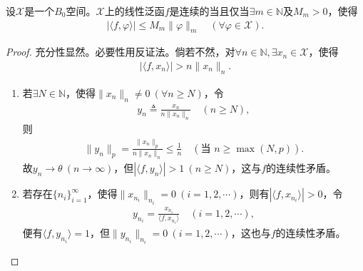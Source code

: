 \documentclass[../../main.tex]{subfiles}%
\begin{document}
\begin{lemma}\label{lemma:泛函分析--引理hweiowj}
设$\mathscr{X}$是一个$B_0$空间。$\mathscr{X}$上的线性泛函$f$是连续的当且仅当$\exists m\in\mathbb{N}$及$M_m>0$，使得
\begin{align*}
|\langle f,\varphi\rangle|\leqslant M_m\|\varphi\|_m\quad(\forall\varphi\in\mathscr{X}).
\end{align*}
\end{lemma}
\begin{proof}
充分性显然。必要性用反证法。倘若不然，对$\forall n\in\mathbb{N},\exists x_n\in\mathscr{X}$，使得
\begin{align}
|\langle f,x_n\rangle|>n\|x_n\|_n.\label{eq:4-2-5}
\end{align}
\begin{enumerate}[(1)]
\item 若$\exists N\in\mathbb{N}$，使得$\|x_n\|_n\neq0\ (\forall n\geqslant N)$，令
\begin{align*}
y_n\triangleq\frac{x_n}{n\|x_n\|_n}\quad(n\geqslant N),
\end{align*}
则
\begin{align*}
\|y_n\|_p=\frac{\|x_n\|_p}{n\|x_n\|_n}\leqslant\frac{1}{n}\quad(\text{当 }n\geqslant\max(N,p)).
\end{align*}
故$y_n\to\theta\ (n\to\infty)$，但$|\langle f,y_n\rangle|>1\ (n\geqslant N)$，这与$f$的连续性矛盾。

\item 若存在$\{n_i\}_{i=1}^\infty$，使得$\|x_{n_i}\|_{n_i}=0\ (i=1,2,\cdots)$，则有$|\langle f,x_{n_i}\rangle|>0$，令
\begin{align*}
y_{n_i}=\frac{x_{n_i}}{\langle f,x_{n_i}\rangle}\quad(i=1,2,\cdots),
\end{align*}
便有$\langle f,y_{n_i}\rangle=1$，但$\|y_{n_i}\|_{n_i}=0\ (i=1,2,\cdots)$，这也与$f$的连续性矛盾。
\end{enumerate}
\end{proof}
\end{document}
